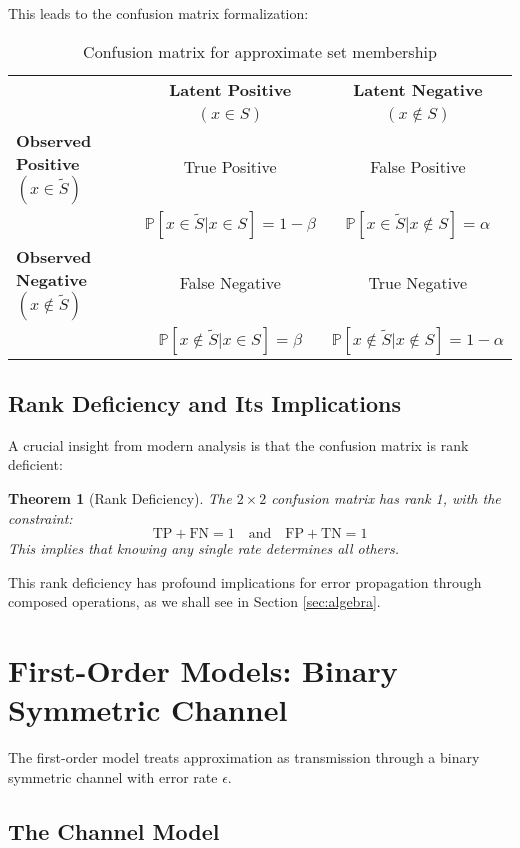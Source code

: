 \documentclass[11pt]{article}
\newtheorem{theorem}{Theorem}[section]
\newcommand{\observed}[1]{\tilde{#1}}  %
\newcommand{\prob}[1]{\mathbb{P}\left[#1\right]}
\newcommand{\fprate}{\alpha}  %
\newcommand{\fnrate}{\beta}   %
\begin{document}
This leads to the confusion matrix formalization:

\begin{table}[h]
\centering
\begin{tabular}{lcc}
\toprule
& \textbf{Latent Positive} & \textbf{Latent Negative} \\
& $(x \in S)$ & $(x \notin S)$ \\
\midrule
\textbf{Observed Positive} $(x \in \observed{S})$ & True Positive & False Positive \\
& $\prob{x \in \observed{S} | x \in S} = 1-\fnrate$ & $\prob{x \in \observed{S} | x \notin S} = \fprate$ \\
\textbf{Observed Negative} $(x \notin \observed{S})$ & False Negative & True Negative \\
& $\prob{x \notin \observed{S} | x \in S} = \fnrate$ & $\prob{x \notin \observed{S} | x \notin S} = 1-\fprate$ \\
\bottomrule
\end{tabular}
\caption{Confusion matrix for approximate set membership}
\end{table}

\subsection{Rank Deficiency and Its Implications}

A crucial insight from modern analysis is that the confusion matrix is rank deficient:

\begin{theorem}[Rank Deficiency]
The $2 \times 2$ confusion matrix has rank 1, with the constraint:
$$\text{TP} + \text{FN} = 1 \quad \text{and} \quad \text{FP} + \text{TN} = 1$$
This implies that knowing any single rate determines all others.
\end{theorem}

This rank deficiency has profound implications for error propagation through composed operations, as we shall see in Section \ref{sec:algebra}.

\section{First-Order Models: Binary Symmetric Channel}
\label{sec:first-order}

The first-order model treats approximation as transmission through a binary symmetric channel with error rate $\epsilon$.

\subsection{The Channel Model}
\end{document}
